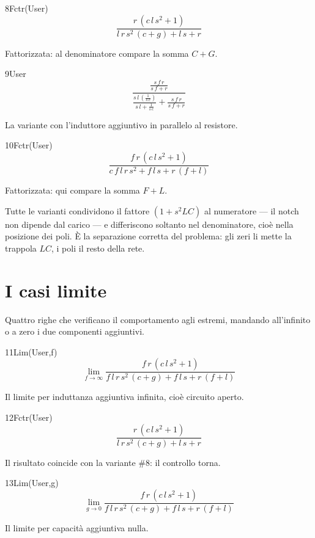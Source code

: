 \begin{espr}{8}{Fctr(User)}{}
\[
\frac{r\, \left(c\, l\, s^{2} + 1\right)}{l\, r\, s^{2}\, \left(c + g\right) + l\, s + r}
\]
\end{espr}
Fattorizzata: al denominatore compare la somma $C+G$.

\begin{espr}{9}{User}{}
\[
\frac{\frac{s\, f\, r}{s\, f + r}}{\frac{s\, l\, \left(\frac{1}{s\, c}\right)}{s\, l + \frac{1}{s\, c}} + \frac{s\, f\, r}{s\, f + r}}
\]
\end{espr}
La variante con l'induttore aggiuntivo in parallelo al resistore.

\begin{espr}{10}{Fctr(User)}{}
\[
\frac{f\, r\, \left(c\, l\, s^{2} + 1\right)}{c\, f\, l\, r\, s^{2} + f\, l\, s + r\, \left(f + l\right)}
\]
\end{espr}
Fattorizzata: qui compare la somma $F+L$.


Tutte le varianti condividono il fattore $\left(1+s^2LC\right)$ al numeratore — il notch non dipende dal carico — e differiscono soltanto nel denominatore, cioè nella posizione dei poli. È la separazione corretta del problema: gli zeri li mette la trappola $LC$, i poli il resto della rete.

\section{I casi limite}

Quattro righe che verificano il comportamento agli estremi, mandando all'infinito o a zero i due componenti aggiuntivi.

\begin{espr}{11}{Lim(User,f)}{}
\[
\lim_{f \to \infty} \frac{f\, r\, \left(c\, l\, s^{2} + 1\right)}{f\, l\, r\, s^{2}\, \left(c + g\right) + f\, l\, s + r\, \left(f + l\right)}
\]
\end{espr}
Il limite per induttanza aggiuntiva infinita, cioè circuito aperto.

\begin{espr}{12}{Fctr(User)}{}
\[
\frac{r\, \left(c\, l\, s^{2} + 1\right)}{l\, r\, s^{2}\, \left(c + g\right) + l\, s + r}
\]
\end{espr}
Il risultato coincide con la variante $\#8$: il controllo torna.

\begin{espr}{13}{Lim(User,g)}{}
\[
\lim_{g \to 0} \frac{f\, r\, \left(c\, l\, s^{2} + 1\right)}{f\, l\, r\, s^{2}\, \left(c + g\right) + f\, l\, s + r\, \left(f + l\right)}
\]
\end{espr}
Il limite per capacità aggiuntiva nulla.

